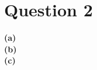 \documentclass{article}
\begin{document}
\section{Question 2}
\textbf{(a)}\\
\textbf{(b)}\\
\textbf{(c)}\\
\end{document}
